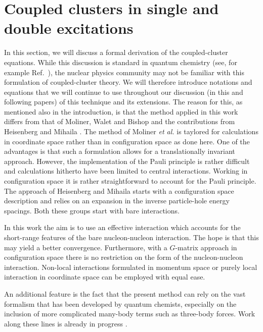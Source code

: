 \documentclass[aps,prc,twocolumn,floatfix]{revtex4}
\begin{document}
\section{Coupled clusters in single and double excitations}
\label{sec:ccsd}


In this section, we will discuss a formal
derivation of the coupled-cluster equations.
While this discussion is
standard in quantum chemistry (see, for example Ref.~\cite{comp_chem_rev00}), 
the nuclear physics community may
not be familiar with this formulation of coupled-cluster theory. 
We will therefore introduce notations and equations that we 
will continue to use throughout our discussion (in this and 
following papers) of this technique and its extensions. 
The reason for this, 
as mentioned also in the introduction, is that the method applied in this
work differs from that
of Moliner, Walet and Bishop \cite{mwb02} and the contributions
from Heisenberg and Mihaila \cite{mh00a,mh00b,mh99,hm99}. 
The method of Moliner {\em et al.} \cite{mwb02} is taylored for 
calculations in coordinate space rather than in configuration space 
as done here. One of the advantages is that such a  formulation allows
for a translationally invariant approach. However, the implementation
of the Pauli principle is rather difficult and calculations hitherto
have been limited to central interactions. 
Working in configuration space it is rather straightforward to account for
the Pauli principle.
The approach of Heisenberg and Mihaila \cite{mh00a,mh00b,mh99,hm99} starts
with a configuration space description and relies on an expansion
in the inverse particle-hole energy spacings. 
Both these groups start with bare interactions. 

In this work the aim is to use an effective interaction which accounts 
for the short-range features of the bare nucleon-nucleon interaction.
The hope is that this may yield a better convergence. Furthermore, with a
$G$-matrix approach in configuration space there is no restriction
on the form of the nucleon-nucleon interaction. Non-local interactions
formulated in momentum space or purely local interaction in
coordinate space can be employed with equal ease.

An additional feature is the fact that the present method can rely on the
vast formalism that has been developed by quantum chemists, especially
on the inclusion of more complicated 
many-body terms such as three-body forces. Work along these lines is already in 
progress \cite{ccsdt03}.
\end{document}
